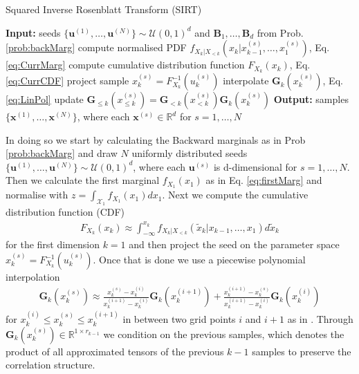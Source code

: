 \begin{algorithm}[!th]
	\caption{Squared Inverse Rosenblatt Transform (SIRT)}
	\begin{algorithmic}[1]
		\STATE \textbf{Input:} seeds $\{ \bm{u}^{(1)},\dots, \bm{u}^{(N)} \} \sim \mathcal{U}(0,1)^d $ and $\bm{B}_1 , \dots,\bm{B}_d$  from Prob. \ref{prob:backMarg}
		\STATE compute normalised PDF $ f_{X_k|X_{<k}}(x_k|x^{(s)}_{k-1},\dots,x^{(s)}_1)$, Eq. \ref{eq:CurrMarg}
		\STATE compute cumulative distribution function $F_{X_k}(x_k)$, Eq. \ref{eq:CurrCDF}
		\STATE project sample $x^{(s)}_k = F_{X_k}^{-1}(u^{(s)}_k)$
		\STATE interpolate $\bm{G}_k(x^{(s)}_k)$, Eq. \ref{eq:LinPol}
		\STATE update $\bm{G}_{\leq k}(x^{(s)}_{\leq k}) = \bm{G}_{<k}(x^{(s)}_{<k}) \bm{G}_k(x^{(s)}_k)$
		\ENDFOR
		\ENDFOR
		\STATE \textbf{Output:} samples $\{ \bm{x}^{(1)},\dots, \bm{x}^{(N)} \} $, where each $\bm{x}^{(s)} \in \mathbb{R}^d$ for $s = 1, \dots, N$
	\end{algorithmic}
	\label{alg:SIRT}
\end{algorithm}
In doing so we start by calculating the Backward marginals as in Prob \ref{prob:backMarg} and draw $N$ uniformly distributed seeds $\{ \bm{u}^{(1)},\dots, \bm{u}^{(N)} \} \sim \mathcal{U}(0,1)^d $, where each $\bm{u}^{(s)}$ is d-dimensional for $s = 1, \dots, N$.
Then we calculate the first marginal $f_{X_1}(x_1)$ as in Eq. \ref{eq:firstMarg} and normalise with $z = \int_{\mathcal{X}_1} f_{X_1}(x_1) d x_1$.
Next we compute the cumulative distribution function (CDF)
\begin{align}
	F_{X_k}(x_k) \approx \int_{-\infty}^{x_k} f_{X_k|X_{<k}}(\tilde{x}_k|x_{k-1},\dots,x_1) d \tilde{x}_k
	\label{eq:CurrCDF}
\end{align}
for the first dimension $k = 1$ and then project the seed  on the parameter space $x^{(s)}_k = F_{X_k}^{-1}(u^{(s)}_k)$.
Once that is done we use a piecewise polynomial interpolation
\begin{align}
	\bm{G}_k(x^{(s)}_k) \approx   \frac{x^{(s)}_k - x^{(i)}_k }{x^{(i+1)}_k -x^{(i)}_k } \bm{G}_k(x^{(i+1)}_k) + \frac{ x^{(i+1)}_k - x^{(s)}_k}{x^{(i+1)}_k -x^{(i)}_k } \bm{G}_k(x^{(i)}_k)
	\label{eq:LinPol}
\end{align}
for $x^{(i)}_k \leq x^{(s)}_k \leq x^{(i+1)}_k$ in between two grid points $i$ and $i+1$ as in \cite{dolgov2020approximation}.
Through $\bm{G}_k(x^{(s)}_k)\in \mathbb{R}^{1 \times r_{k-1}}$ we condition on the previous samples, which denotes the product of all approximated tensors of the previous $k-1$ samples to preserve the correlation structure.
